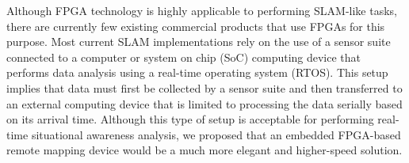 \par
Although FPGA technology is highly applicable to performing SLAM-like tasks, there are currently few existing commercial products that use FPGAs for this purpose. Most current SLAM implementations rely on the use of a sensor suite connected to a computer or system on chip (SoC) computing device that performs data analysis using a real-time operating system (RTOS). This setup implies that data must first be collected by a sensor suite and then transferred to an external computing device that is limited to processing the data serially based on its arrival time. Although this type of setup is acceptable for performing real-time situational awareness analysis, we proposed that an embedded FPGA-based remote mapping device would be a much more elegant and higher-speed solution.